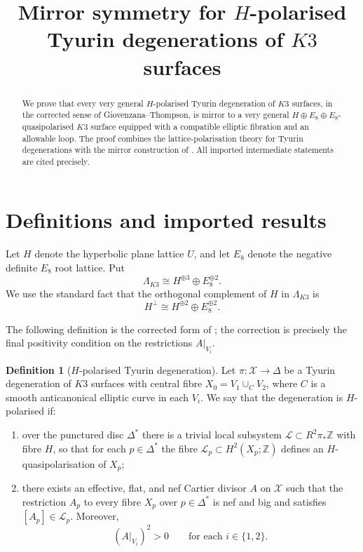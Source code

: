 \documentclass[11pt]{amsart}
\title{Mirror symmetry for \(H\)-polarised Tyurin degenerations of \(K3\) surfaces}
\author{}
\date{}
\theoremstyle{definition}
\newtheorem{definition}[theorem]{Definition}
\theoremstyle{remark}
\begin{document}
\begin{abstract}
We prove that every very general \(H\)-polarised Tyurin degeneration of \(K3\)
surfaces, in the corrected sense of Giovenzana--Thompson, is mirror to a very
general \(H\oplus E_8\oplus E_8\)-quasipolarised \(K3\) surface equipped with a
compatible elliptic fibration and an allowable loop.  The proof combines the
lattice-polarisation theory for Tyurin degenerations with the mirror construction
of \cite{GT24}.  All imported intermediate statements are cited precisely.
\end{abstract}
\maketitle

\section{Definitions and imported results}

Let \(H\) denote the hyperbolic plane lattice \(U\), and let \(E_8\) denote the
negative definite \(E_8\) root lattice.  Put
\[
\Lambda_{K3}\cong H^{\oplus 3}\oplus E_8^{\oplus 2}.
\]
We use the standard fact that the orthogonal complement of \(H\) in
\(\Lambda_{K3}\) is
\[
H^\perp\cong H^{\oplus 2}\oplus E_8^{\oplus 2}.
\]

The following definition is the corrected form of \cite[Definition 3.20]{GT24};
the correction is precisely the final positivity condition on the restrictions
\(A|_{V_i}\).

\begin{definition}[\(H\)-polarised Tyurin degeneration]
\label{def:H-tyurin}
Let \(\pi\colon \mathcal X\to \Delta\) be a Tyurin degeneration of \(K3\)
surfaces with central fibre \(X_0=V_1\cup_C V_2\), where \(C\) is a smooth
anticanonical elliptic curve in each \(V_i\).  We say that the degeneration is
\(H\)-polarised if:
\begin{enumerate}
\item over the punctured disc \(\Delta^*\) there is a trivial local subsystem
\(\mathcal L\subset R^2\pi_*\mathbb Z\) with fibre \(H\), so that for each
\(p\in\Delta^*\) the fibre \(\mathcal L_p\subset H^2(X_p;\mathbb Z)\) defines
an \(H\)-quasipolarisation of \(X_p\);
\item there exists an effective, flat, and nef Cartier divisor \(A\) on
\(\mathcal X\) such that the restriction \(A_p\) to every fibre \(X_p\) over
\(p\in\Delta^*\) is nef and big and satisfies \([A_p]\in\mathcal L_p\).
Moreover,
\[
(A|_{V_i})^2>0\qquad\text{for each }i\in\{1,2\}.
\]
\end{enumerate}
\end{definition}
\end{document}
